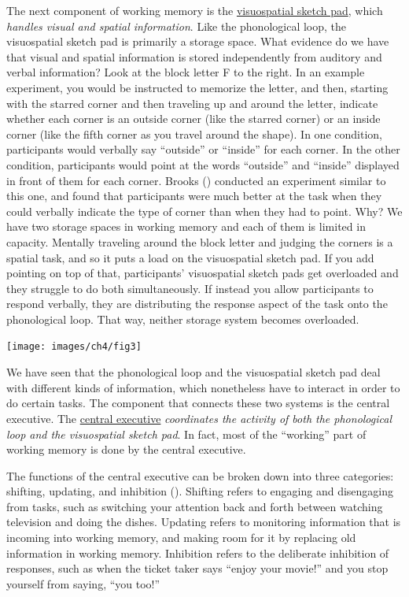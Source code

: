 \documentclass[
]{krantz}
\begin{document}
The next component of working memory is the \hyperref[visuospatial-sketch-pad]{visuospatial sketch pad}, which \emph{handles visual and spatial information}. Like the phonological loop, the visuospatial sketch pad is primarily a storage space. What evidence do we have that visual and spatial information is stored independently from auditory and verbal information? Look at the block letter F to the right. In an example experiment, you would be instructed to memorize the letter, and then, starting with the starred corner and then traveling up and around the letter, indicate whether each corner is an outside corner (like the starred corner) or an inside corner (like the fifth corner as you travel around the shape). In one condition, participants would verbally say ``outside'' or ``inside'' for each corner. In the other condition, participants would point at the words ``outside'' and ``inside'' displayed in front of them for each corner. Brooks () conducted an experiment similar to this one, and found that participants were much better at the task when they could verbally indicate the type of corner than when they had to point. Why? We have two storage spaces in working memory and each of them is limited in capacity. Mentally traveling around the block letter and judging the corners is a spatial task, and so it puts a load on the visuospatial sketch pad. If you add pointing on top of that, participants' visuospatial sketch pads get overloaded and they struggle to do both simultaneously. If instead you allow participants to respond verbally, they are distributing the response aspect of the task onto the phonological loop. That way, neither storage system becomes overloaded.

\begin{center}\texttt{[image: images/ch4/fig3]} \end{center}

We have seen that the phonological loop and the visuospatial sketch pad deal with different kinds of information, which nonetheless have to interact in order to do certain tasks. The component that connects these two systems is the central executive. The \hyperref[central-executive]{central executive} \emph{coordinates the activity of both the phonological loop and the visuospatial sketch pad}. In fact, most of the ``working'' part of working memory is done by the central executive.

The functions of the central executive can be broken down into three categories: shifting, updating, and inhibition (). Shifting refers to engaging and disengaging from tasks, such as switching your attention back and forth between watching television and doing the dishes. Updating refers to monitoring information that is incoming into working memory, and making room for it by replacing old information in working memory. Inhibition refers to the deliberate inhibition of responses, such as when the ticket taker says ``enjoy your movie!'' and you stop yourself from saying, ``you too!''
\end{document}
